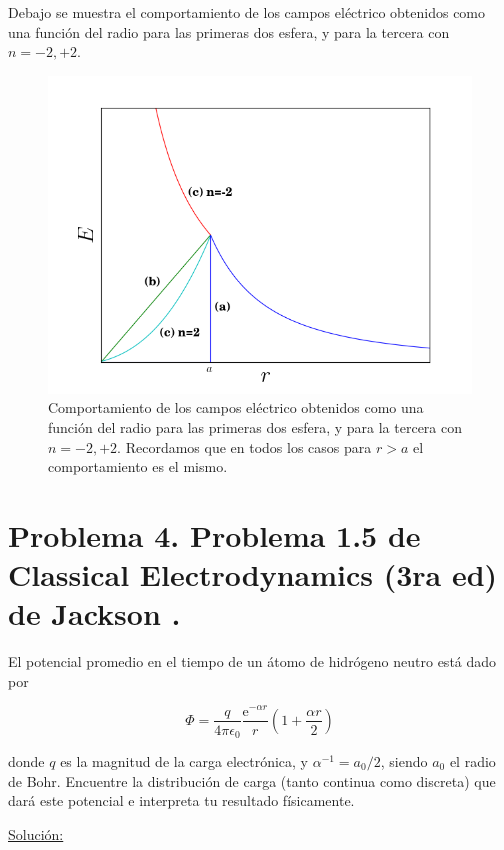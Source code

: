 \documentclass[a4paper,11pt]{article}
\numberwithin{equation}{section}
\newcommand{\euler}{\mathrm{e}}
\begin{document}
Debajo se muestra el comportamiento de los campos eléctrico obtenidos como 
una función del radio para las primeras dos esfera, y para la tercera 
con $n= -2,+2$. 

\begin{figure}[H]
 \center 
\includegraphics[scale=0.44]{problema3fig1}
 \caption{Comportamiento de los campos eléctrico obtenidos como 
una función del radio para las primeras dos esfera, y para la tercera 
con $n= -2,+2$. Recordamos que en todos los casos para $r>a$ el comportamiento 
es el mismo.}
 \label{fig:problema3fig1}
\end{figure}

\section{Problema 4. Problema 1.5 de Classical Electrodynamics (3ra ed) de 
Jackson \cite{jackson}.}

El potencial promedio en el tiempo de un átomo de hidrógeno neutro está dado por 

$$
\Phi = \frac{q}{4\pi\epsilon_0}\frac{\euler^{-\alpha r}}{r}\left(1 + 
\frac{\alpha r}{2}\right)
$$

donde $q$ es la magnitud de la carga electrónica, y $\alpha^{-1} = a_0/2$, siendo 
$a_0$ el radio de Bohr. Encuentre la distribución de carga (tanto continua como 
discreta) que dará este potencial e interpreta tu resultado físicamente.

\vspace{.3cm}

\underline{Solución:} \vspace{.3cm}
\end{document}
